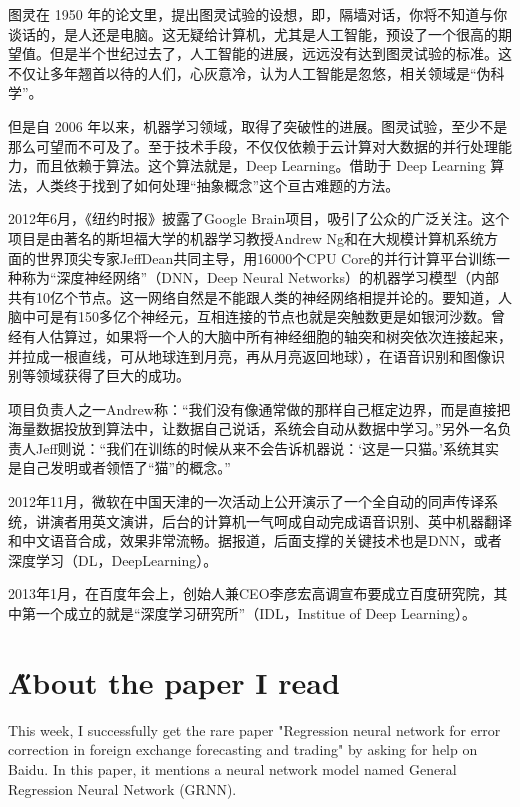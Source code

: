 \documentclass[12pt]{article}
\begin{document}
       图灵在 1950 年的论文里，提出图灵试验的设想，即，隔墙对话，你将不知道与你谈话的，是人还是电脑。这无疑给计算机，尤其是人工智能，预设了一个很高的期望值。但是半个世纪过去了，人工智能的进展，远远没有达到图灵试验的标准。这不仅让多年翘首以待的人们，心灰意冷，认为人工智能是忽悠，相关领域是“伪科学”。

        但是自 2006 年以来，机器学习领域，取得了突破性的进展。图灵试验，至少不是那么可望而不可及了。至于技术手段，不仅仅依赖于云计算对大数据的并行处理能力，而且依赖于算法。这个算法就是，Deep Learning。借助于 Deep Learning 算法，人类终于找到了如何处理“抽象概念”这个亘古难题的方法。


       2012年6月，《纽约时报》披露了Google Brain项目，吸引了公众的广泛关注。这个项目是由著名的斯坦福大学的机器学习教授Andrew Ng和在大规模计算机系统方面的世界顶尖专家JeffDean共同主导，用16000个CPU Core的并行计算平台训练一种称为“深度神经网络”（DNN，Deep Neural Networks）的机器学习模型（内部共有10亿个节点。这一网络自然是不能跟人类的神经网络相提并论的。要知道，人脑中可是有150多亿个神经元，互相连接的节点也就是突触数更是如银河沙数。曾经有人估算过，如果将一个人的大脑中所有神经细胞的轴突和树突依次连接起来，并拉成一根直线，可从地球连到月亮，再从月亮返回地球），在语音识别和图像识别等领域获得了巨大的成功。

       项目负责人之一Andrew称：“我们没有像通常做的那样自己框定边界，而是直接把海量数据投放到算法中，让数据自己说话，系统会自动从数据中学习。”另外一名负责人Jeff则说：“我们在训练的时候从来不会告诉机器说：‘这是一只猫。’系统其实是自己发明或者领悟了“猫”的概念。”

  

       2012年11月，微软在中国天津的一次活动上公开演示了一个全自动的同声传译系统，讲演者用英文演讲，后台的计算机一气呵成自动完成语音识别、英中机器翻译和中文语音合成，效果非常流畅。据报道，后面支撑的关键技术也是DNN，或者深度学习（DL，DeepLearning）。

       2013年1月，在百度年会上，创始人兼CEO李彦宏高调宣布要成立百度研究院，其中第一个成立的就是“深度学习研究所”（IDL，Institue of Deep Learning）。

\section{\H About the paper I read}
This week, I successfully get the rare paper "Regression neural network for error correction in foreign exchange forecasting and trading" by asking for help on Baidu. In this paper, it mentions a neural network model named General Regression Neural Network (GRNN).
\end{document}
